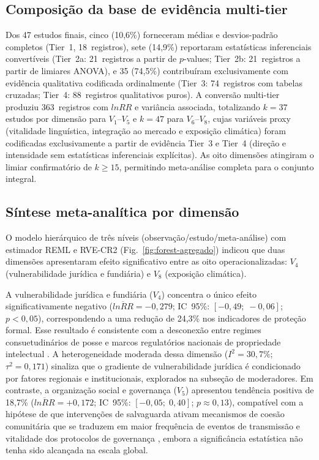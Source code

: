 \documentclass[12pt,a4paper]{article}
\begin{document}
\subsection{Composição da base de evidência multi-tier}
\label{sec:tier-composition}

Dos 47 estudos finais, cinco (10,6\%) forneceram médias e desvios-padrão completos (Tier~1, 18~registros), sete (14,9\%) reportaram estatísticas inferenciais convertíveis (Tier~2a: 21~registros a partir de $p$-values; Tier~2b: 21~registros a partir de limiares ANOVA), e 35 (74,5\%) contribuíram exclusivamente com evidência qualitativa codificada ordinalmente (Tier~3: 74~registros com tabelas cruzadas; Tier~4: 88~registros qualitativos puros). A conversão multi-tier produziu 363~registros com $lnRR$ e variância associada, totalizando $k = 37$ estudos por dimensão para $V_1$--$V_5$ e $k = 47$ para $V_6$--$V_8$, cujas variáveis proxy (vitalidade linguística, integração ao mercado e exposição climática) foram codificadas exclusivamente a partir de evidência Tier~3 e Tier~4 (direção e intensidade sem estatísticas inferenciais explícitas). As oito dimensões atingiram o limiar confirmatório de $k \geq 15$, permitindo meta-análise completa para o conjunto integral.

\subsection{Síntese meta-analítica por dimensão}
\label{sec:meta-results}

O modelo hierárquico de três níveis (observação/estudo/meta-análise) com estimador REML e RVE-CR2 (Fig.~\ref{fig:forest-agregado}) indicou que duas dimensões apresentaram efeito significativo entre as oito operacionalizadas: $V_4$ (vulnerabilidade jurídica e fundiária) e $V_8$ (exposição climática).

A vulnerabilidade jurídica e fundiária ($V_4$) concentra o único efeito significativamente negativo ($\overline{lnRR} = -0{,}279$; IC~95\%: $[-0{,}49;\; -0{,}06]$; $p < 0{,}05$), correspondendo a uma redução de 24,3\% nos indicadores de proteção formal. Esse resultado é consistente com a desconexão entre regimes consuetudinários de posse e marcos regulatórios nacionais de propriedade intelectual \citep{Santilli2009,Dutfield2004,Cottier2004}. A heterogeneidade moderada dessa dimensão ($I^2 = 30{,}7\%$; $\tau^2 = 0{,}171$) sinaliza que o gradiente de vulnerabilidade jurídica é condicionado por fatores regionais e institucionais, explorados na subseção de moderadores. Em contraste, a organização social e governança ($V_5$) apresentou tendência positiva de 18,7\% ($\overline{lnRR} = +0{,}172$; IC~95\%: $[-0{,}05;\; 0{,}40]$; $p \approx 0{,}13$), compatível com a hipótese de que intervenções de salvaguarda ativam mecanismos de coesão comunitária que se traduzem em maior frequência de eventos de transmissão e vitalidade dos protocolos de governança \citep{Ostrom1990,Pretty2003,Berkes2007,Rathwell2015}, embora a significância estatística não tenha sido alcançada na escala global.
\end{document}
